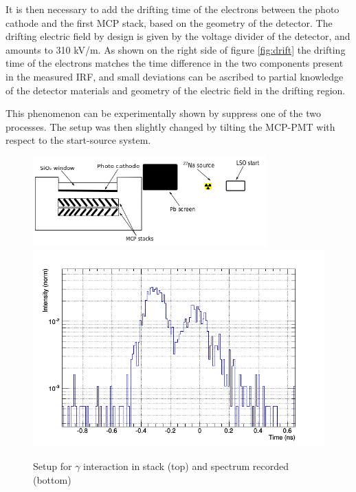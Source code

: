 It is then necessary to add the drifting time of the electrons between the photo cathode and the first MCP stack, based on the geometry of the detector. The drifting electric field by design is given by the voltage divider of the detector, and amounts to 310 kV/m.
As shown on the right side of figure \ref{fig:drift} the drifting time of the electrons matches the time difference in the two components present in the measured IRF, and small deviations can be ascribed to partial knowledge of the detector materials and geometry of the electric field in the drifting region.

This phenomenon can be experimentally shown by suppress one of the two processes. The setup was then slightly changed by tilting the MCP-PMT with respect to the start-source system.
\begin{figure}[htbp]
\begin{center}
\includegraphics[width=9cm]{../Pictures/Chapter_8/screen_irf_2.png}
\includegraphics[width=12cm]{../Pictures/Chapter_8/turn_1.png}
\end{center}
\caption[Setup for $\gamma$ interaction in stack]{Setup for $\gamma$ interaction in stack (top) and spectrum recorded (bottom)}
\label{fig:twist2}
\end{figure}
